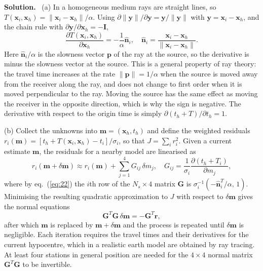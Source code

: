 \documentclass[a4paper,12pt]{paper}
\newenvironment{solution}{\par\noindent\textbf{Solution.}\ }{\par\medskip}
\begin{document}
\begin{solution}
(a) In a homogeneous medium rays are straight lines, so
$T(\mathbf{x}_{i},\mathbf{x}_{h})=\|\mathbf{x}_{i}-\mathbf{x}_{h}\|/\alpha$. Using
$\partial\|\mathbf{y}\|/\partial\mathbf{y}=\mathbf{y}/\|\mathbf{y}\|$ with
$\mathbf{y}=\mathbf{x}_{i}-\mathbf{x}_{h}$, and the chain rule with
$\partial\mathbf{y}/\partial\mathbf{x}_{h}=-\mathbf{I}$,
\begin{equation}
\frac{\partial T(\mathbf{x}_{i},\mathbf{x}_{h})}{\partial\mathbf{x}_{h}}
=-\frac{1}{\alpha}\hat{\mathbf{n}}_{i},\quad
\hat{\mathbf{n}}_{i}=\frac{\mathbf{x}_{i}-\mathbf{x}_{h}}{\|\mathbf{x}_{i}-\mathbf{x}_{h}\|}.
\label{eq:22}
\end{equation}
Here $\hat{\mathbf{n}}_{i}/\alpha$ is the slowness vector $\mathbf{p}$ of the ray at the
source, so the derivative is minus the slowness vector at the source. This is a general
property of ray theory: the travel time increases at the rate $\|\mathbf{p}\|=1/\alpha$ when
the source is moved away from the receiver along the ray, and does not change to first order
when it is moved perpendicular to the ray. Moving the source has the same effect as moving
the receiver in the opposite direction, which is why the sign is negative. The derivative with
respect to the origin time is simply $\partial(t_{h}+T)/\partial t_{h}=1$.

(b) Collect the unknowns into $\mathbf{m}=(\mathbf{x}_{h},t_{h})$ and define the weighted
residuals $r_{i}(\mathbf{m})=[t_{h}+T(\mathbf{x}_{i},\mathbf{x}_{h})-t_{i}]/\sigma_{i}$, so
that $J=\sum_{i}r_{i}^{2}$. Given a current estimate $\mathbf{m}$, the residuals for a nearby
model are linearised as
\begin{equation}
r_{i}(\mathbf{m}+\delta\mathbf{m})\approx r_{i}(\mathbf{m})+\sum_{j=1}^{4}G_{ij}\,\delta m_{j},\quad
G_{ij}=\frac{1}{\sigma_{i}}\frac{\partial(t_{h}+T_{i})}{\partial m_{j}},
\label{eq:23}
\end{equation}
where by eq.~(\ref{eq:22}) the $i$th row of the $N_{s}\times4$ matrix $\mathbf{G}$ is
$\sigma_{i}^{-1}(-\hat{\mathbf{n}}_{i}^{T}/\alpha,\,1)$. Minimising the resulting quadratic
approximation to $J$ with respect to $\delta\mathbf{m}$ gives the normal equations
\begin{equation}
\mathbf{G}^{T}\mathbf{G}\,\delta\mathbf{m}=-\mathbf{G}^{T}\mathbf{r},
\label{eq:24}
\end{equation}
after which $\mathbf{m}$ is replaced by $\mathbf{m}+\delta\mathbf{m}$ and the process is
repeated until $\delta\mathbf{m}$ is negligible. Each iteration requires the travel times
and their derivatives for the current hypocentre, which in a realistic earth model are
obtained by ray tracing. At least four stations in general position are needed for the
$4\times4$ normal matrix $\mathbf{G}^{T}\mathbf{G}$ to be invertible.


\end{solution}
\end{document}
